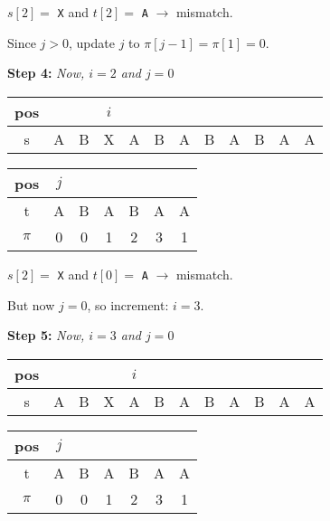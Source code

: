 $s[2] = $ \texttt{X} and $t[2] = $ \texttt{A} $\longrightarrow$ mismatch.

Since $j > 0$, update $j$ to $\pi[j - 1] = \pi[1] = 0$.

\textbf{Step 4: }\textit{Now, $i = 2$ and $j = 0$}

\begin{table}[H]
\centering
\begin{tabular}{|c|c|c|c|c|c|c|c|c|c|c|c|}
\hline
pos   &   &   &$i$&   &   &   &   &   &   &   &   \\ \hline
s     & A & B & X & A & B & A & B & A & B & A & A \\ \hline
\end{tabular}
\end{table}

\begin{table}[H]
\centering
\begin{tabular}{|c|c|c|c|c|c|c|}
\hline
pos   & $j$ &   &   &   &   &   \\ \hline
t     & A & B & A & B & A & A \\ \hline
$\pi$ & 0 & 0 & 1 & 2 & 3 & 1 \\ \hline
\end{tabular}
\end{table}

$s[2] = $ \texttt{X} and $t[0] = $ \texttt{A} $\longrightarrow$ mismatch.

But now $j = 0$, so increment: $i = 3$.

\textbf{Step 5: }\textit{Now, $i = 3$ and $j = 0$}

\begin{table}[H]
\centering
\begin{tabular}{|c|c|c|c|c|c|c|c|c|c|c|c|}
\hline
pos   &   &   &   &$i$&   &   &   &   &   &   &   \\ \hline
s     & A & B & X & A & B & A & B & A & B & A & A \\ \hline
\end{tabular}
\end{table}

\begin{table}[H]
\centering
\begin{tabular}{|c|c|c|c|c|c|c|}
\hline
pos   & $j$ &   &   &   &   &   \\ \hline
t     & A & B & A & B & A & A \\ \hline
$\pi$ & 0 & 0 & 1 & 2 & 3 & 1 \\ \hline
\end{tabular}
\end{table}

